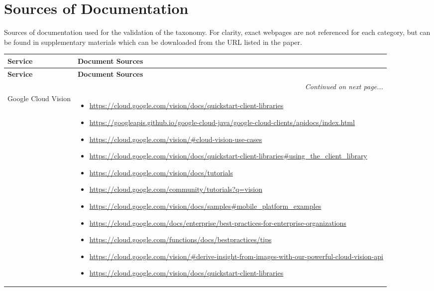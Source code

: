 \clearpage
\section{Sources of Documentation}\label{tse2020:tab:docsources}

Sources of documentation used for the validation of the taxonomy. For clarity, exact webpages are not referenced for each category, but can be found in supplementary materials which can be downloaded from the URL listed in the paper.
\bigskip

{\scriptsize
\begin{longtable}{p{.2\linewidth}|p{.725\linewidth}}
\toprule
  \textbf{Service} & \textbf{Document Sources}\\
  \midrule
  \endfirsthead
  \toprule
  \textbf{Service} & \textbf{Document Sources}\\
  \midrule
  \endhead
  \bottomrule
  \multicolumn{2}{r}{\textit{Continued on next page...}}\\
  \endfoot
  \bottomrule
  \endlastfoot
    Google Cloud Vision &
    \vspace{-1.75mm}
    \begin{itemize}[label=,leftmargin=10pt,topsep=0pt,partopsep=0pt,noitemsep,nolistsep,itemindent=-10pt]
\item \url{https://cloud.google.com/vision/docs/quickstart-client-libraries}
\item \url{https://googleapis.github.io/google-cloud-java/google-cloud-clients/apidocs/index.html}
\item \url{https://cloud.google.com/vision/#cloud-vision-use-cases}
\item \url{https://cloud.google.com/vision/docs/quickstart-client-libraries#using_the_client_library}
\item \url{https://cloud.google.com/vision/docs/tutorials}
\item \url{https://cloud.google.com/community/tutorials?q=vision}
\item \url{https://cloud.google.com/vision/docs/samples#mobile_platform_examples}
\item \url{https://cloud.google.com/docs/enterprise/best-practices-for-enterprise-organizations}
\item \url{https://cloud.google.com/functions/docs/bestpractices/tips}
\item \url{https://cloud.google.com/vision/#derive-insight-from-images-with-our-powerful-cloud-vision-api}
\item \url{https://cloud.google.com/vision/docs/quickstart-client-libraries}

\end{itemize}
\end{longtable}}
